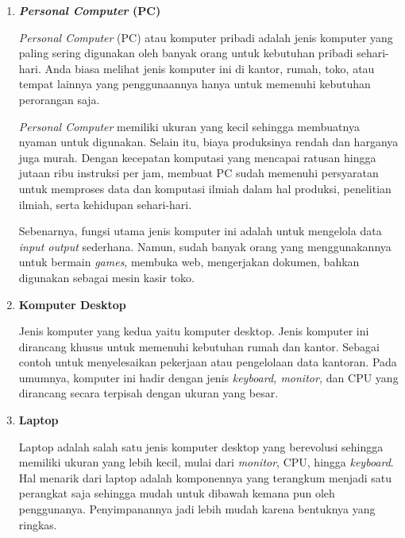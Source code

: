\documentclass[12pt]{article}
\begin{document}
\begin{enumerate}
    \item \textbf{\textit{Personal Computer} (PC)}
    
    \hspace{0.61cm}\textit{Personal Computer} (PC) atau komputer pribadi adalah jenis komputer yang paling sering digunakan oleh banyak orang untuk kebutuhan pribadi sehari-hari. Anda biasa melihat jenis komputer ini di kantor, rumah, toko, atau tempat lainnya yang penggunaannya hanya untuk memenuhi kebutuhan perorangan saja. 

    \hspace{0.61cm}\textit{Personal Computer} memiliki ukuran yang kecil sehingga membuatnya nyaman untuk digunakan. Selain itu, biaya produksinya rendah dan harganya juga murah. Dengan kecepatan komputasi yang mencapai ratusan hingga jutaan ribu instruksi per jam, membuat PC sudah memenuhi persyaratan untuk memproses data dan komputasi ilmiah dalam hal produksi, penelitian ilmiah, serta kehidupan sehari-hari. 

    \hspace{0.61cm}Sebenarnya, fungsi utama jenis komputer ini adalah untuk mengelola data \textit{input output} sederhana. Namun, sudah banyak orang yang menggunakannya untuk bermain \textit{games}, membuka web, mengerjakan dokumen, bahkan digunakan sebagai mesin kasir toko. 
    
    \item \textbf{Komputer Desktop}

    \hspace{0.61cm}Jenis komputer yang kedua yaitu komputer desktop. Jenis komputer ini dirancang khusus untuk memenuhi kebutuhan rumah dan kantor. Sebagai contoh untuk menyelesaikan pekerjaan atau pengelolaan data kantoran. Pada umumnya, komputer ini hadir dengan jenis \textit{keyboard, monitor,} dan CPU yang dirancang secara terpisah dengan ukuran yang besar. 
    
    \item \textbf{Laptop}
    
    \hspace{0.61cm}Laptop adalah salah satu jenis komputer desktop yang berevolusi sehingga memiliki ukuran yang lebih kecil, mulai dari \textit{monitor}, CPU, hingga \textit{keyboard}. Hal menarik dari laptop adalah komponennya yang terangkum menjadi satu perangkat saja sehingga mudah untuk dibawah kemana pun oleh penggunanya. Penyimpanannya jadi lebih mudah karena bentuknya yang ringkas. 


\end{enumerate}
\end{document}
